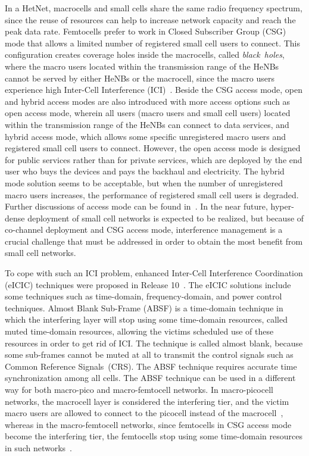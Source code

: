 \documentclass[paper]{ieice}
\begin{document}
In a HetNet, macrocells and small cells share the same radio frequency spectrum, since the reuse of resources can help to increase network capacity and reach the peak data rate. Femtocells prefer to work in Closed Subscriber Group (CSG) mode that allows a limited number of registered small cell users to connect. This configuration creates coverage holes inside the macrocells, called \emph{black~holes}, where the macro users located within the transmission range of the HeNBs cannot be served by either HeNBs or the macrocell, since the macro users experience high Inter-Cell Interference (ICI)~\cite{zahir2013i}. Beside the CSG access mode, open and hybrid access modes are also introduced with more access options such as open access mode, wherein all users (macro users and small cell users) located within the transmission range of the HeNBs can connect to data services, and hybrid access mode, which allows some specific unregistered macro users and registered small cell users to connect. However, the open access mode is designed for public services rather than for private services, which are deployed by the end user who buys the devices and pays the backhaul and electricity. The hybrid mode solution seems to be acceptable, but when the number of unregistered macro users increases, the performance of registered small cell users is degraded.  Further discussions of access mode can be found in~\cite{de2010a,Kwon2011,Kwon2013}. In the near future, hyper-dense deployment of small cell networks is expected to be  realized, but because of co-channel deployment and CSG access mode, interference management is a crucial challenge  that must be addressed in order to obtain the most benefit from small cell networks.

To cope with such an ICI problem, enhanced Inter-Cell Interference Coordination (eICIC) techniques were proposed in Release 10~\cite{R1-104256,R1-104968,R1-104661}. The eICIC solutions include some techniques such as time-domain, frequency-domain, and power control techniques. Almost Blank Sub-Frame (ABSF) is a time-domain technique in which the interfering layer will stop using some time-domain resources, called muted time-domain resources, allowing the victims scheduled use of these resources in order to get rid of ICI. The technique is called almost blank, because some sub-frames cannot be muted at all to transmit the control signals such as Common Reference Signals~(CRS). The ABSF technique requires accurate time synchronization among all cells. The ABSF technique can be used in a different way for both macro-pico and macro-femtocell networks. In macro-picocell networks, the macrocell layer is considered the interfering tier, and the victim macro users are allowed to connect to the picocell instead of the macrocell~\cite{Wang2012,Pedersen12,David2011b}, whereas in the macro-femtocell networks, since femtocells in CSG access mode  become the interfering tier, the femtocells stop using some time-domain resources in such networks~\cite{David2011a}.
\end{document}
